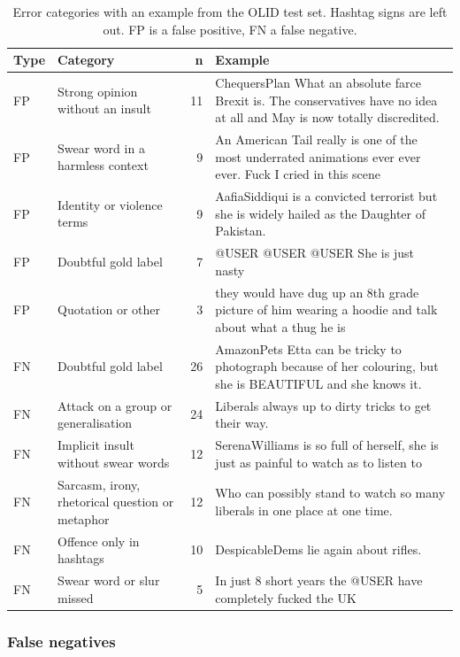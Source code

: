 \documentclass[11pt,a4paper]{article}
\begin{document}
\begin{table}[H]
\centering
\caption{Error categories with an example from the OLID test set. Hashtag signs are left out. FP is a false positive, FN a false negative.}
\label{tab:categories}
\small
\begin{tabular}{L{0.85cm}L{3.9cm}rL{8.1cm}}
\toprule
Type & Category & n & Example \\
\midrule
FP & Strong opinion without an insult & 11 & ChequersPlan What an absolute farce Brexit is. The conservatives have no idea at all and May is now totally discredited. \\
FP & Swear word in a harmless context & 9 & An American Tail really is one of the most underrated animations ever ever ever. Fuck I cried in this scene \\
FP & Identity or violence terms & 9 & AafiaSiddiqui is a convicted terrorist but she is widely hailed as the Daughter of Pakistan. \\
FP & Doubtful gold label & 7 & @USER @USER @USER She is just nasty \\
FP & Quotation or other & 3 & they would have dug up an 8th grade picture of him wearing a hoodie and talk about what a thug he is \\
\midrule
FN & Doubtful gold label & 26 & AmazonPets Etta can be tricky to photograph because of her colouring, but she is BEAUTIFUL and she knows it. \\
FN & Attack on a group or generalisation & 24 & Liberals always up to dirty tricks to get their way. \\
FN & Implicit insult without swear words & 12 & SerenaWilliams is so full of herself, she is just as painful to watch as to listen to \\
FN & Sarcasm, irony, rhetorical question or metaphor & 12 & Who can possibly stand to watch so many liberals in one place at one time. \\
FN & Offence only in hashtags & 10 & DespicableDems lie again about rifles. \\
FN & Swear word or slur missed & 5 & In just 8 short years the @USER have completely fucked the UK \\
\bottomrule
\end{tabular}
\end{table}

\subsubsection{False negatives}
\end{document}
